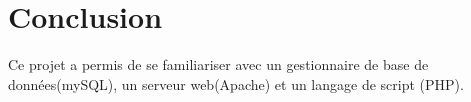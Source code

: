 \section{Conclusion}
\noindent Ce projet a permis de se familiariser avec un gestionnaire de base de données(mySQL), un serveur web(Apache) et un langage de script (PHP).